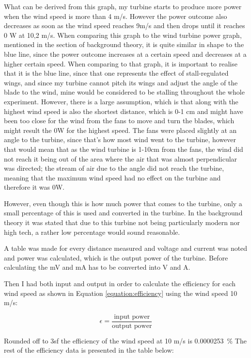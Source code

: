 \documentclass[12pt]{article}
\begin{document}
What can be derived from this graph, my turbine starts to produce more power when the wind speed is more than 4 m/s.
However the power outcome also decreases as soon as the wind speed reaches 9m/s and then drops until it reaches 0 W at 10,2 m/s.
When comparing this graph to the wind turbine power graph, mentioned in the section of background theory, it is quite similar in shape to the blue line, since the power outcome increases at a certain speed and decreases at a higher certain speed.
When comparing to that graph, it is important to realise that it is the blue line, since that one represents the effect of stall-regulated wings, and since my turbine cannot pitch its wings and adjust the angle of the blade to the wind, mine would be considered to be stalling throughout the whole experiment.
However, there is a large assumption, which is that along with the highest wind speed is also the shortest distance, which is 0-1 cm and might have been too close for the wind from the fans to move and turn the blades, which might result the 0W for the highest speed.
The fans were placed slightly at an angle to the turbine, since that's how most wind went to the turbine, however that would mean that as the wind turbine is 1-10cm from the fans, the wind did not reach it being out of the area where the air that was almost perpendicular was directed; the stream of air due to the angle did not reach the turbine, meaning that the maximum wind speed had no effect on the turbine and therefore it was 0W.


However, even though this is how much power that comes to the turbine, only a small percentage of this is used and converted in the turbine.
In the background theory it was stated that due to this turbine not being particularly modern nor high tech, a rather low percentage would sound reasonable.

A table was made for every distance measured and voltage and current was noted and power was calculated, which is the output power of the turbine.
Before calculating the mV and mA has to be converted into V and A.

Then I had both input and output in order to calculate the efficiency for each wind speed as shown in Equation \ref{equation:efficiency} using the wind speed 10 m/s:

\begin{equation}
  \epsilon = \frac{\text{input power}}{\text{output power}}
  \label{equation:efficiency}
\end{equation}

%
Rounded off to 3sf the efficiency of the wind speed at 10 m/s is \SI{0,0000253}{\percent}
The rest of the efficiency data is presented in the table below:
\end{document}

